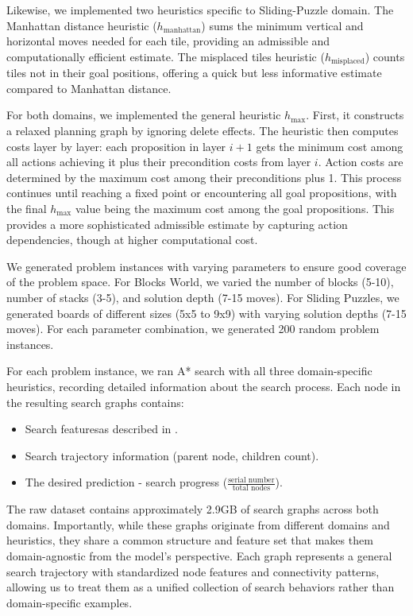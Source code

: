 \documentclass[letterpaper]{article}
\begin{document}
Likewise, we implemented two heuristics specific to Sliding-Puzzle domain. The Manhattan distance heuristic ($h_{\text{manhattan}}$) sums the minimum vertical and horizontal moves needed for each tile, providing an admissible and computationally efficient estimate. The misplaced tiles heuristic ($h_{\text{misplaced}}$) counts tiles not in their goal positions, offering a quick but less informative estimate compared to Manhattan distance.

For both domains, we implemented the general heuristic $h_{\max}$. First, it constructs a relaxed planning graph by ignoring delete effects. The heuristic then computes costs layer by layer: each proposition in layer $i+1$ gets the minimum cost among all actions achieving it plus their precondition costs from layer $i$. Action costs are determined by the maximum cost among their preconditions plus 1. This process continues until reaching a fixed point or encountering all goal propositions, with the final $h_{\max}$ value being the maximum cost among the goal propositions. This provides a more sophisticated admissible estimate by capturing action dependencies, though at higher computational cost.

We generated problem instances with varying parameters to ensure good coverage of the problem space. For Blocks World, we varied the number of blocks (5-10), number of stacks (3-5), and solution depth (7-15 moves). For Sliding Puzzles, we generated boards of different sizes (5x5 to 9x9) with varying solution depths (7-15 moves). For each parameter combination, we generated 200 random problem instances.

For each problem instance, we ran A* search with all three domain-specific heuristics, recording detailed information about the search process. Each node in the resulting search graphs contains:
\begin{itemize}
    \item Search featuresas described in .
    \item Search trajectory information (parent node, children count).
    \item The desired prediction - search progress ($\frac{\text{serial number}}{\text{total nodes}}$).
\end{itemize}

The raw dataset contains approximately 2.9GB of search graphs across both domains. Importantly, while these graphs originate from different domains and heuristics, they share a common structure and feature set that makes them domain-agnostic from the model's perspective. Each graph represents a general search trajectory with standardized node features and connectivity patterns, allowing us to treat them as a unified collection of search behaviors rather than domain-specific examples.
\end{document}
